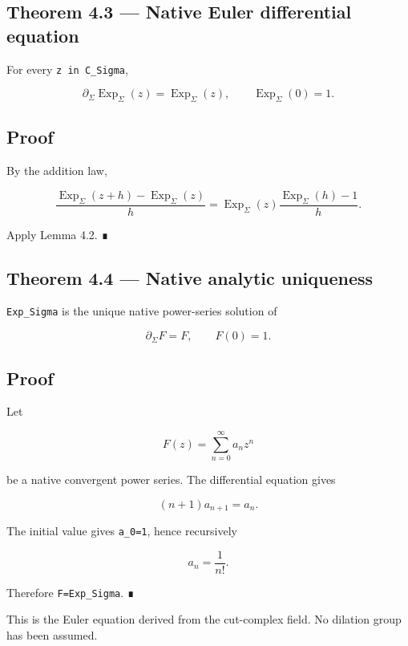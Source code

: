 \hypertarget{theorem-4.3-native-euler-differential-equation}{%
\subsection{Theorem 4.3 --- Native Euler differential equation}\label{theorem-4.3-native-euler-differential-equation}}

For every \texttt{z\ in\ C\_Sigma},

\[
\boxed{
\partial_\Sigma\operatorname{Exp}_\Sigma(z)
=
\operatorname{Exp}_\Sigma(z),
\qquad
\operatorname{Exp}_\Sigma(0)=1.
}
\]

\hypertarget{proof-4}{%
\subsection{Proof}\label{proof-4}}

By the addition law,

\[
\frac{\operatorname{Exp}_\Sigma(z+h)-
      \operatorname{Exp}_\Sigma(z)}{h}
=
\operatorname{Exp}_\Sigma(z)
\frac{\operatorname{Exp}_\Sigma(h)-1}{h}.
\]

Apply Lemma 4.2. ∎

\hypertarget{theorem-4.4-native-analytic-uniqueness}{%
\subsection{Theorem 4.4 --- Native analytic uniqueness}\label{theorem-4.4-native-analytic-uniqueness}}

\texttt{Exp\_Sigma} is the unique native power-series solution of

\[
\partial_\Sigma F=F,
\qquad
F(0)=1.
\]

\hypertarget{proof-5}{%
\subsection{Proof}\label{proof-5}}

Let

\[
F(z)=\sum_{n=0}^{\infty}a_nz^n
\]

be a native convergent power series. The differential equation gives

\[
(n+1)a_{n+1}=a_n.
\]

The initial value gives \texttt{a\_0=1}, hence recursively

\[
a_n=\frac1{n!}.
\]

Therefore \texttt{F=Exp\_Sigma}. ∎

This is the Euler equation derived from the cut-complex field. No dilation group
has been assumed.

